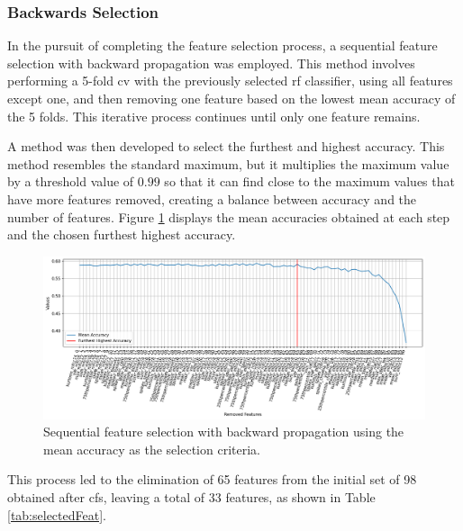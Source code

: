 \subsubsection{Backwards Selection}

In the pursuit of completing the feature selection process, a sequential feature selection with backward propagation was employed. This method involves performing a 5-fold \ac{cv} with the previously selected \ac{rf} classifier, using all features except one, and then removing one feature based on the lowest mean accuracy of the 5 folds. This iterative process continues until only one feature remains.

A method was then developed to select the furthest and highest accuracy. This method resembles the standard maximum, but it multiplies the maximum value by a threshold value of $0.99$ so that it can find close to the maximum values that have more features removed, creating a balance between accuracy and the number of features. Figure \ref{fig:backProp1} displays the mean accuracies obtained at each step and the chosen furthest highest accuracy.

\begin{figure}[H]
	\centering
	\includegraphics[width=1\linewidth]{figs/4_1_traditional/backProp1.png}
	\caption{Sequential feature selection with backward propagation using the mean accuracy as the selection criteria.}
	\label{fig:backProp1}
\end{figure}

This process led to the elimination of 65 features from the initial set of 98 obtained after \ac{cfs}, leaving a total of 33 features, as shown in Table \ref{tab:selectedFeat}.

